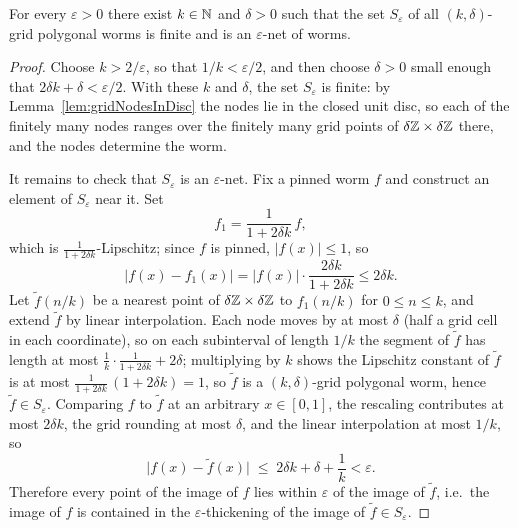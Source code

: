 \begin{theorem}
    \label{thm:finiteEpsilonNet}
    \leanok
    For every $\varepsilon > 0$ there exist $k \in \mathbb{N}$ and $\delta > 0$ such
    that the set $S_\varepsilon$ of all $(k,\delta)$-grid polygonal worms is
    finite and is an $\varepsilon$-net of worms.
\end{theorem}
\begin{proof}
    Choose $k > 2/\varepsilon$, so that $1/k < \varepsilon/2$, and then choose
    $\delta > 0$ small enough that $2\delta k + \delta < \varepsilon/2$. With
    these $k$ and $\delta$, the set $S_\varepsilon$ is finite: by
    Lemma~\ref{lem:gridNodesInDisc} the nodes lie in the closed unit disc, so each of
    the finitely many nodes ranges over the finitely many grid points of
    $\delta\mathbb{Z} \times \delta\mathbb{Z}$ there, and the nodes determine the worm.

    It remains to check that $S_\varepsilon$ is an $\varepsilon$-net. Fix a
    pinned worm $f$ and construct an element of $S_\varepsilon$ near it. Set
    \[
        f_1 = \frac{1}{1 + 2\delta k}\, f ,
    \]
    which is $\tfrac{1}{1+2\delta k}$-Lipschitz; since $f$ is pinned,
    $\lvert f(x) \rvert \le 1$, so
    \[
        \lvert f(x) - f_1(x) \rvert
            = \lvert f(x) \rvert \cdot \frac{2\delta k}{1 + 2\delta k}
            \le 2\delta k .
    \]
    Let $\tilde f(n/k)$ be a nearest point of $\delta\mathbb{Z} \times \delta\mathbb{Z}$ to
    $f_1(n/k)$ for $0 \le n \le k$, and extend $\tilde f$ by linear
    interpolation. Each node moves by at most $\delta$ (half a grid cell in
    each coordinate), so on each subinterval of length $1/k$ the segment of
    $\tilde f$ has length at most
    $\tfrac{1}{k}\cdot\tfrac{1}{1+2\delta k} + 2\delta$; multiplying by $k$
    shows the Lipschitz constant of $\tilde f$ is at most
    $\tfrac{1}{1+2\delta k}\,(1 + 2\delta k) = 1$, so $\tilde f$ is a
    $(k,\delta)$-grid polygonal worm, hence $\tilde f \in S_\varepsilon$. Comparing $f$ to $\tilde f$
    at an arbitrary $x \in [0,1]$, the rescaling contributes at most
    $2\delta k$, the grid rounding at most $\delta$, and the linear
    interpolation at most $1/k$, so
    \[
        \lvert f(x) - \tilde f(x) \rvert
            \;\le\; 2\delta k + \delta + \frac{1}{k} < \varepsilon .
    \]
    Therefore every point of the image of $f$ lies within $\varepsilon$ of the
    image of $\tilde f$, i.e.\ the image of $f$ is contained in the
    $\varepsilon$-thickening of the image of $\tilde f \in S_\varepsilon$.
\end{proof}

